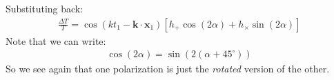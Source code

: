 \documentclass[../template.tex]{subfiles}
\begin{document}
Substituting back:
\begin{align*}
    \frac{\Delta T}{T} = \cos(kt_1 - \bm{k}\cdot \bm{x}_1) [h_+ \cos(2 \alpha) + h_\times \sin(2 \alpha)] 
\end{align*}
Note that we can write:
\begin{align*}
    \cos(2 \alpha) = \sin(2 (\alpha + 45^\circ))
\end{align*}
So we see again that one polarization is just the \textit{rotated} version of the other.  
\end{document}
